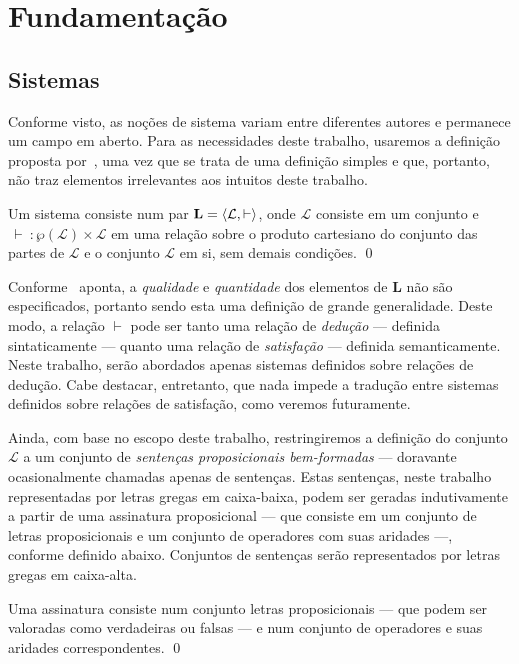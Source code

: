 \chapter{Fundamentação}

\section{Sistemas}

Conforme visto, as noções de sistema variam entre diferentes autores e permanece um campo em aberto. Para as necessidades deste trabalho, usaremos a definição proposta por~\cite{Beziau}, uma vez que se trata de uma definição simples e que, portanto, não traz elementos irrelevantes aos intuitos deste trabalho.

\begin{definition}[Sistema]
    Um sistema consiste num par $\mathbf{L} = \langle\mathcal{L}, \vdash\rangle$, onde $\mathcal{L}$ consiste em um conjunto e $\, \vdash \: : \wp(\mathcal{L}) \times \mathcal{L}$ em uma relação sobre o produto cartesiano do conjunto das partes de $\mathcal{L}$ e o conjunto $\mathcal{L}$ em si, sem demais condições.
    \qed{}
\end{definition}

Conforme~\cite{Beziau} aponta, a \emph{qualidade} e \emph{quantidade} dos elementos de $\mathbf{L}$ não são especificados, portanto sendo esta uma definição de grande generalidade. Deste modo, a relação $\vdash$ pode ser tanto uma relação de \emph{dedução} --- definida sintaticamente --- quanto uma relação de \emph{satisfação} --- definida semanticamente. Neste trabalho, serão abordados apenas sistemas definidos sobre relações de dedução. Cabe destacar, entretanto, que nada impede a tradução entre sistemas definidos sobre relações de satisfação, como veremos futuramente.

Ainda, com base no escopo deste trabalho, restringiremos a definição do conjunto $\mathcal{L}$ a um conjunto de \emph{sentenças proposicionais bem-formadas} --- doravante ocasionalmente chamadas apenas de sentenças. Estas sentenças, neste trabalho representadas por letras gregas em caixa-baixa, podem ser geradas indutivamente a partir de uma assinatura proposicional --- que consiste em um conjunto de letras proposicionais e um conjunto de operadores com suas aridades ---, conforme definido abaixo. Conjuntos de sentenças serão representados por letras gregas em caixa-alta.

\begin{definition}[Assinatura]
    Uma assinatura consiste num conjunto letras proposicionais --- que podem ser valoradas como verdadeiras ou falsas --- e num conjunto de operadores e suas aridades correspondentes.
    \qed{}
\end{definition}

